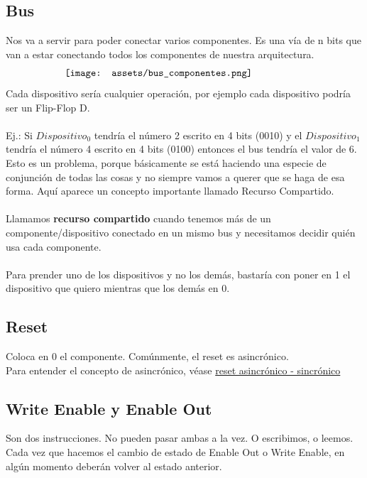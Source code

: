 \documentclass[10pt,a4paper]{article}
\begin{document}
\subsection*{Bus}
Nos va a servir para poder conectar varios componentes. Es una vía de n bits que van a estar conectando todos los componentes de nuestra arquitectura.
\[\begin{minipage}[b]{0.7\textwidth}
    \texttt{[image: assets/bus\_componentes.png]}
    \label{fig:bus_componentes}
\end{minipage}\]
Cada dispositivo sería cualquier operación, por ejemplo cada dispositivo podría ser un Flip-Flop D. \\ \\
Ej.: Si \(Dispositivo_{0}\) tendría el número 2 escrito en 4 bits (0010) y el \(Dispositivo_{1}\) tendría el número 4 escrito en 4 bits (0100) entonces el bus tendría el valor de 6. Esto es un problema, porque básicamente se está haciendo una especie de conjunción de todas las cosas y no siempre vamos a querer que se haga de esa forma. Aquí aparece un concepto importante llamado Recurso Compartido. \\ \\
Llamamos \textbf{recurso compartido} cuando tenemos más de un componente/dispositivo conectado en un mismo bus y necesitamos decidir quién usa cada componente. \\ \\
Para prender uno de los dispositivos y no los demás, bastaría con poner en 1 el dispositivo que quiero mientras que los demás en 0. 
\subsection*{Reset}
Coloca en 0 el componente. Comúnmente, el reset es asincrónico. \\
Para entender el concepto de asincrónico, véase \hyperref[subsec:reset_sincronico_asincronico]{reset asincrónico - sincrónico}
\subsection*{Write Enable y Enable Out}
Son dos instrucciones. No pueden pasar ambas a la vez. O escribimos, o leemos.
Cada vez que hacemos el cambio de estado de Enable Out o Write Enable, en algún momento deberán volver al estado anterior.
\end{document}

